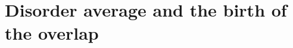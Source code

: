 \documentclass[nobib,justified]{tufte-handout}
\newcommand{\dbar}[1]{\overline{#1}}
\newcommand{\Tr}{\operatorname{Tr}}
\begin{document}

\section{Disorder average and the birth of the overlap}
\end{document}

